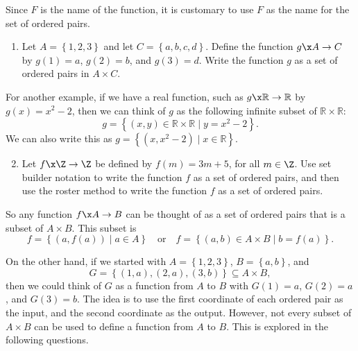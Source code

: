 \begin{previewactivity}
\noindent
\note  Since  $F$  is the name of the function, it is customary to use  $F$  as the name for the set of ordered pairs.
% 
\noindent
 \begin{enumerate}
\item Let  $A = \left\{ {1, 2, 3} \right\}$ and let  $C = \left\{ {a, b, c, d} \right\}$.  Define the function  $g\x A \to C$ by  $g( 1 ) = a$, $g( 2 ) = b$, and 
$g( 3 ) = d$.  Write the function  $g$  as a set of ordered pairs in  $A \times C$. 
\end{enumerate}
For another example, if we have a real function, such as  $g\x \mathbb{R} \to \mathbb{R}$  by  $g( x ) = x^2  - 2$, then we can think of  $g$  as the following infinite subset of  $\mathbb{R} \times \mathbb{R}$:
\[
g = \left\{ { {( {x, y} ) \in \mathbb{R} \times \mathbb{R}} \mid y = x^2  - 2} \right\}\!.
\]
We can also write this  as 
$g = \left\{ {( {x, x^2 - 2} )} \mid x \in \mathbb{R} \right\}$.  


\begin{enumerate} \setcounter{enumi}{1}
\item Let $f\x \Z \to \Z$ be defined by $f(m) = 3m +5$, for all $m \in \Z$.  Use set builder notation to write the function $f$ as a set of ordered pairs, and then use the roster method to write the function $f$ as a set of ordered pairs.
\end{enumerate}
So any function  $f\x A \to B$ can be thought of as a set of ordered pairs that is a subset of  $A \times B$.  This subset is
\[
f = \left\{ { {( {a, f( a )} ) } \mid a \in A} \right\} \quad \text{or} 
\quad f = \left\{ {( {a, b} ) \in A \times B   \mid b = f( a )} \right\}\!.
\]

\noindent
On the other hand, if we started with  $A = \left\{ {1, 2, 3} \right\}$, 
$B = \left\{ {a, b} \right\}$, and 
\[
G = \left\{ {( {1, a} ), ( {2, a} ), ( {3, b} )} \right\} \subseteq A \times B ,
\]
then we could think of  $G$  as a function from  $A$  to  $B$  with  $G( 1 ) = a$, $G( 2 ) = a$, and $G( 3 ) = b.$  The idea is to use the first coordinate of each ordered pair as the input, and the second coordinate as the output.  However, not every subset of  $A \times B$ can be used to define a function from  $A$  to  $B$.  This is explored in the following questions.


\end{previewactivity}
